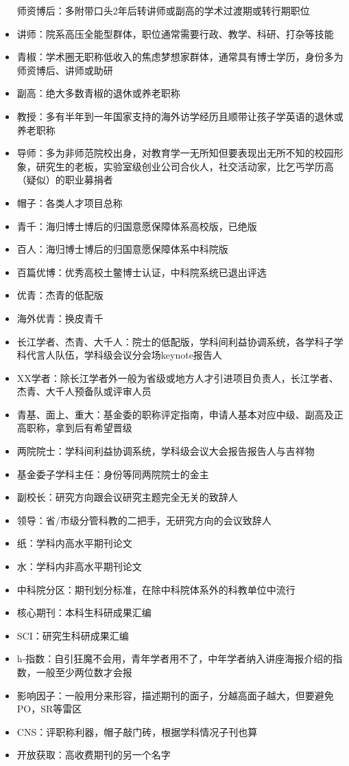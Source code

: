 \documentclass[]{tufte-book}
\begin{document}
\begin{itemize}
  师资博后：多附带口头2年后转讲师或副高的学术过渡期或转行期职位
\item
  讲师：院系高压全能型群体，职位通常需要行政、教学、科研、打杂等技能
\item
  青椒：学术圈无职称低收入的焦虑梦想家群体，通常具有博士学历，身份多为师资博后、讲师或助研
\item
  副高：绝大多数青椒的退休或养老职称
\item
  教授：多有半年到一年国家支持的海外访学经历且顺带让孩子学英语的退休或养老职称
\item
  导师：多为非师范院校出身，对教育学一无所知但要表现出无所不知的校园形象，研究生的老板，实验室级创业公司合伙人，社交活动家，比乞丐学历高（疑似）的职业募捐者
\item
  帽子：各类人才项目总称
\item
  青千：海归博士博后的归国意愿保障体系高校版，已绝版
\item
  百人：海归博士博后的归国意愿保障体系中科院版
\item
  百篇优博：优秀高校土鳖博士认证，中科院系统已退出评选
\item
  优青：杰青的低配版
\item
  海外优青：换皮青千
\item
  长江学者、杰青、大千人：院士的低配版，学科间利益协调系统，各学科子学科代言人队伍，学科级会议分会场keynote报告人
\item
  XX学者：除长江学者外一般为省级或地方人才引进项目负责人，长江学者、杰青、大千人预备队或评审人员
\item
  青基、面上、重大：基金委的职称评定指南，申请人基本对应中级、副高及正高职称，拿到后有希望晋级
\item
  两院院士：学科间利益协调系统，学科级会议大会报告报告人与吉祥物
\item
  基金委子学科主任：身份等同两院院士的金主
\item
  副校长：研究方向跟会议研究主题完全无关的致辞人
\item
  领导：省/市级分管科教的二把手，无研究方向的会议致辞人
\item
  纸：学科内高水平期刊论文
\item
  水：学科内非高水平期刊论文
\item
  中科院分区：期刊划分标准，在除中科院体系外的科教单位中流行
\item
  核心期刊：本科生科研成果汇编
\item
  SCI：研究生科研成果汇编
\item
  h-指数：自引狂魔不会用，青年学者用不了，中年学者纳入讲座海报介绍的指数，一般至少两位数才会报
\item
  影响因子：一般用分来形容，描述期刊的面子，分越高面子越大，但要避免PO，SR等雷区
\item
  CNS：评职称利器，帽子敲门砖，根据学科情况子刊也算
\item
  开放获取：高收费期刊的另一个名字
\end{itemize}
\end{document}
